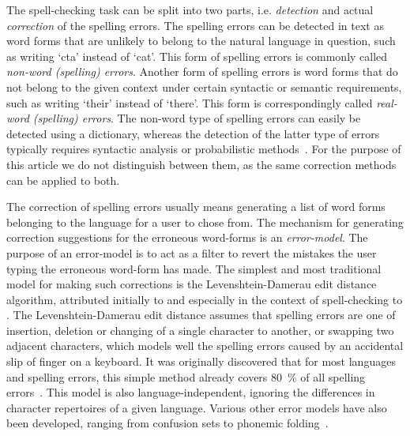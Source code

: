 \documentclass[postprint]{flammie}
\begin{document}
The spell-checking task can be split into two parts, i.e. \emph{detection} and
actual \emph{correction} of the spelling errors. The spelling errors can be
detected in text as word forms that are unlikely to belong to the
natural language in question, such as writing `cta' instead of `cat'. This form
of spelling errors is commonly called \emph{non-word (spelling) errors}.
Another form of spelling errors is word forms that do not belong to the given
context under certain syntactic or semantic requirements, such as writing
`their' instead of `there'. This form is correspondingly called \emph{real-word
(spelling) errors}. The non-word type of spelling errors can easily be detected
using a dictionary, whereas the detection of the latter type of errors typically
requires syntactic analysis or probabilistic methods~\cite{mitton/2009}. For
the purpose of this article we do not distinguish between them, as the same
correction methods can be applied to both.

The correction of spelling errors usually means generating a list of word forms
belonging to the language for a user to chose from. The mechanism for
generating correction suggestions for the erroneous word-forms is an
\emph{error-model}. The purpose of an error-model is to act as a filter to
revert the mistakes the user typing the erroneous word-form has made.  The
simplest and most traditional model for making such corrections is the
Levenshtein-Damerau edit distance algorithm, attributed initially to
\cite{levenshtein/1966} and especially in the context of spell-checking to
\cite{damerau/1964}. The Levenshtein-Damerau edit distance assumes that
spelling errors are one of insertion, deletion or changing of a single
character to another, or swapping two adjacent characters, which models well
the spelling errors caused by an accidental slip of finger on a keyboard. It
was originally discovered that for most languages and spelling errors, this
simple method already covers 80~\% of all spelling errors~\cite{damerau/1964}.
This model is also language-independent, ignoring the differences in character
repertoires of a given language. Various other error models have also been
developed, ranging from confusion sets to phonemic folding~\cite{kukich/1992}.
\end{document}
